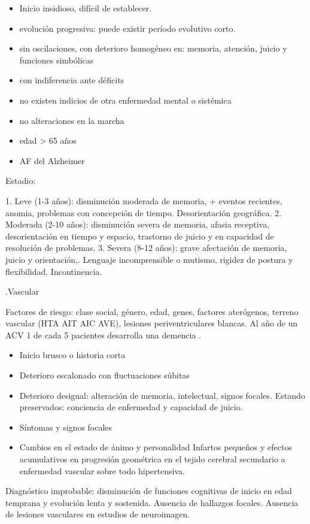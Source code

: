 \begin{itemize}
	\item Inicio insidioso, difícil de establecer.
	\item evolución progresiva: puede existir período evolutivo corto.
	\item sin oscilaciones, con deterioro homogéneo en: memoria, atención, juicio y funciones simbólicas
	\item con indiferencia ante déficits
	\item no existen indicios de otra enfermedad mental o sistémica
	\item no alteraciones en la marcha
	\item edad > 65 años
	\item AF del Alzheimer
\end{itemize}

Estadio:

1. Leve (1-3 años): disminución moderada de memoria, + eventos recientes, anomia, problemas con concepción de tiempo. Desorientación geográfica.
2. Moderada (2-10 años): disminución severa de memoria, afasia receptiva, desorientación en tiempo y espacio, trastorno de juicio y en capacidad de resolución de problemas.
3. Severa (8-12 años): grave afectación de memoria, juicio y orientación,. Lenguaje incomprensible o mutismo, rigidez de postura y flexibilidad. Incontinencia.

.Vascular

Factores de riesgo: clase social, género, edad, genes, factores aterógenos, terreno vascular (HTA AIT AIC AVE), lesiones periventriculares blancas. Al año de un ACV 1 de cada 5 pacientes desarrolla una demencia \cite{craig2022prevalence}.

\begin{itemize}
	\item Inicio brusco o historia corta
	\item Deterioro escalonado con fluctuaciones súbitas
	\item Deterioro desigual: alteración de memoria, intelectual, signos focales. Estando preservados: conciencia de enfermedad y capacidad de juicio.
	\item Síntomas y signos focales
	\item Cambios en el estado de ánimo y personalidad Infartos pequeños y efectos acumulativos en progresión geométrica en el tejido cerebral secundario a enfermedad vascular sobre todo hipertensiva.
\end{itemize}

Diagnóstico improbable: disminución de funciones cognitivas de inicio en edad temprana y evolución lenta y sostenida. Ausencia de hallazgos focales. Ausencia de lesiones vasculares en estudios de neuroimagen.

